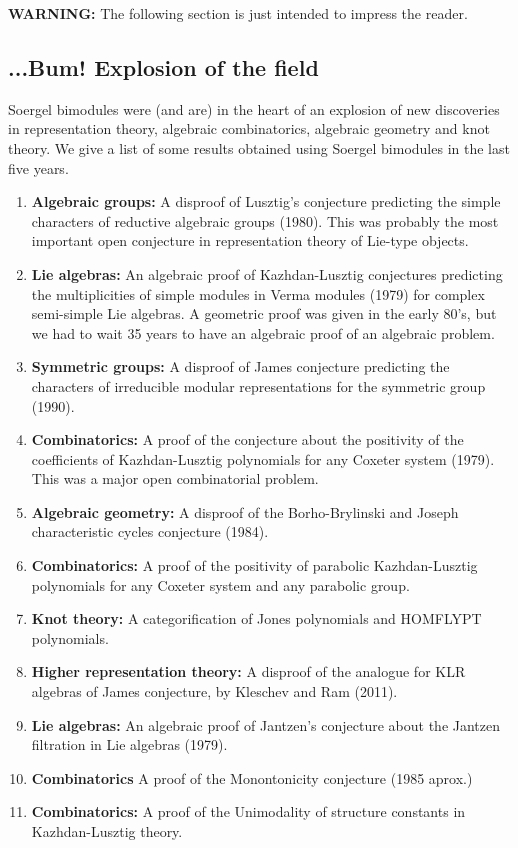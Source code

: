 \documentclass[12pt]{wart}
\theoremstyle{remark}
\begin{document}
\textbf{WARNING: } The following section is just intended to impress the reader.

\subsection{...Bum! Explosion of the field}  Soergel bimodules were (and are) in the heart of an explosion of new discoveries in representation theory, algebraic combinatorics, algebraic geometry and knot theory.  We give a list of some results obtained using Soergel bimodules in the last five years. 



\begin{enumerate}
\item \textbf{Algebraic groups:} A disproof of Lusztig's conjecture predicting the simple characters of reductive algebraic groups (1980).  This was probably the most important open conjecture in representation theory of Lie-type objects.  
\item \textbf{Lie algebras:} An algebraic proof of Kazhdan-Lusztig conjectures predicting the multiplicities of simple modules in Verma modules  (1979) for complex semi-simple Lie algebras. A geometric proof was given in the early 80's, but we had to wait 35 years to have an algebraic proof of an algebraic problem. 
\item \textbf{Symmetric groups: } A disproof of James conjecture predicting the characters of irreducible modular representations for the symmetric group (1990). 
\item  \textbf{Combinatorics: }A proof of the conjecture about the positivity of the coefficients of Kazhdan-Lusztig polynomials for any Coxeter system (1979). This was a major  open combinatorial problem. 
\item \textbf{Algebraic geometry: } A disproof of the Borho-Brylinski and Joseph characteristic cycles conjecture (1984).
\item \textbf{Combinatorics:} A proof of the positivity of parabolic Kazhdan-Lusztig polynomials  for any Coxeter system and any parabolic group.
\item \textbf{Knot theory: } A categorification of Jones polynomials and HOMFLYPT polynomials.
\item \textbf{Higher representation theory:} A disproof of the analogue for KLR algebras of James conjecture, by Kleschev and Ram (2011).
\item \textbf{Lie algebras: } An algebraic proof of Jantzen's conjecture about the Jantzen filtration in Lie algebras (1979).
\item \textbf{Combinatorics} A proof of the Monontonicity conjecture  (1985 aprox.)
\item \textbf{Combinatorics: }A proof of the Unimodality of structure constants in Kazhdan-Lusztig theory.

\end{enumerate}
\end{document}
